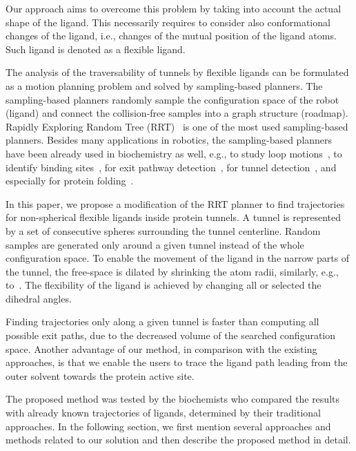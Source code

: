 \documentclass{bmcart}
\begin{document}
Our approach aims to overcome this problem by taking into account the actual shape of the ligand.
This necessarily requires to consider also conformational changes of the ligand, i.e., changes of the mutual position of the ligand atoms.
Such ligand is denoted as a flexible ligand.

The analysis of the traversability of tunnels by flexible ligands can be formulated as a motion planning problem and solved by sampling-based planners.
The sampling-based planners randomly sample the configuration space of the robot (ligand) and connect the collision-free samples into a graph structure (roadmap).
Rapidly Exploring Random Tree (RRT)~\cite{lavalleRRT} is one of the most used sampling-based planners. Besides many applications in robotics, the sampling-based planners have been already used in biochemistry as well, e.g., to study loop motions~\cite{cortes2004geometric}, to identify binding sites~\cite{bayazit2001ligand}, for exit pathway detection~\cite{cortes2010simulating,cortes2005path}, for tunnel detection~\cite{vonasek2017tunnel}, and especially for protein folding~\cite{raveh2009rapid,amato2002using}. %

In this paper, we propose a modification of the RRT planner to find trajectories for non-spherical flexible ligands inside protein tunnels.
A tunnel is represented by a set of consecutive spheres surrounding the tunnel centerline.
Random samples are generated only around a given tunnel instead of the whole configuration space.
To enable the movement of the ligand in the narrow parts of the tunnel, the free-space is dilated by shrinking the atom radii, similarly, e.g., to~\cite{hsu06multilevel}.  %
The flexibility of the ligand is achieved by changing all or selected the dihedral angles.

Finding trajectories only along a given tunnel is faster than computing all possible exit paths, due to the decreased volume of the searched configuration space.
Another advantage of our method, in comparison with the existing approaches, is that we enable the users to trace the ligand path leading from the
outer solvent towards the protein active site.

The proposed method was tested by the biochemists who compared the results with already known trajectories of ligands, determined by their traditional approaches.
In the following section, we first mention several approaches and methods related to our solution and then describe the proposed method in detail.
\end{document}
